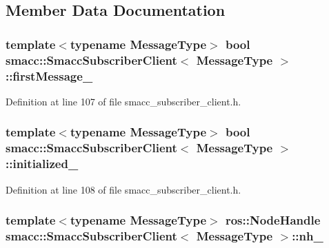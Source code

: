 \subsection{Member Data Documentation}
\subsubsection[{\texorpdfstring{first\+Message\+\_\+}{firstMessage_}}]{\setlength{\rightskip}{0pt plus 5cm}template$<$typename Message\+Type$>$ {\bf bool} {\bf smacc\+::\+Smacc\+Subscriber\+Client}$<$ Message\+Type $>$\+::first\+Message\+\_\+\hspace{0.3cm}{\ttfamily [private]}}\hypertarget{classsmacc_1_1SmaccSubscriberClient_ad7af631a0b6bdacb76a2532a06ad0a03}{}\label{classsmacc_1_1SmaccSubscriberClient_ad7af631a0b6bdacb76a2532a06ad0a03}


Definition at line 107 of file smacc\+\_\+subscriber\+\_\+client.\+h.

\subsubsection[{\texorpdfstring{initialized\+\_\+}{initialized_}}]{\setlength{\rightskip}{0pt plus 5cm}template$<$typename Message\+Type$>$ {\bf bool} {\bf smacc\+::\+Smacc\+Subscriber\+Client}$<$ Message\+Type $>$\+::initialized\+\_\+\hspace{0.3cm}{\ttfamily [private]}}\hypertarget{classsmacc_1_1SmaccSubscriberClient_a429baac945d15cb7d997c41c847f5c33}{}\label{classsmacc_1_1SmaccSubscriberClient_a429baac945d15cb7d997c41c847f5c33}


Definition at line 108 of file smacc\+\_\+subscriber\+\_\+client.\+h.

\subsubsection[{\texorpdfstring{nh\+\_\+}{nh_}}]{\setlength{\rightskip}{0pt plus 5cm}template$<$typename Message\+Type$>$ ros\+::\+Node\+Handle {\bf smacc\+::\+Smacc\+Subscriber\+Client}$<$ Message\+Type $>$\+::nh\+\_\+\hspace{0.3cm}{\ttfamily [protected]}}\hypertarget{classsmacc_1_1SmaccSubscriberClient_addb62aabc4f81ddac5a151642335ab54}{}\label{classsmacc_1_1SmaccSubscriberClient_addb62aabc4f81ddac5a151642335ab54}


